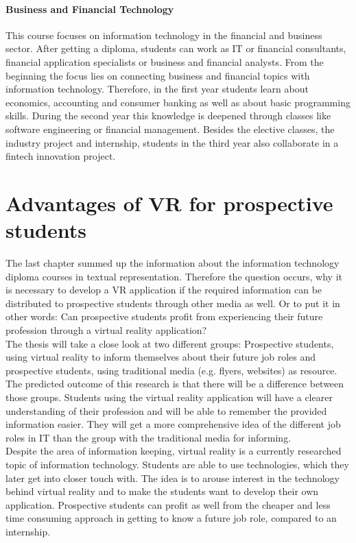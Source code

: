 \paragraph{Business and Financial Technology}
This course focuses on information technology in the financial and business sector. After getting a diploma, students can work as IT or financial consultants, financial application specialists or business and financial analysts. From the beginning the focus lies on connecting business and financial topics with information technology. Therefore, in the first year students learn about economics, accounting and consumer banking as well as about basic programming skills. During the second year this knowledge is deepened through classes like software engineering or financial management. Besides the elective classes, the industry project and internship, students in the third year also collaborate in a fintech innovation project.

\section{Advantages of VR for prospective students}
The last chapter summed up the information about the information technology diploma courses in textual representation. Therefore the question occurs, why it is necessary to develop a VR application if the required information can be distributed to prospective students through other media as well. Or to put it in other words: Can prospective students profit from experiencing their future profession through a virtual reality application? \\
The thesis will take a close look at two different groups: Prospective students, using virtual reality to inform themselves about their future job roles and prospective students, using traditional media (e.g. flyers, websites) as resource.
The predicted outcome of this research is that there will be a difference between those groups. Students using the virtual reality application will have a clearer understanding of their profession and will be able to remember the provided information easier. They will get a more comprehensive idea of the different job roles in IT  than the group with the traditional media for informing. \\

Despite the area of information keeping, virtual reality is a currently researched topic of information technology. Students are able to use technologies, which they later get into closer touch with. The idea is to arouse interest in the technology behind virtual reality and to make the students want to develop their own application. Prospective students can profit as well from the cheaper and less time consuming approach in getting to know a future job role, compared to an internship. 
